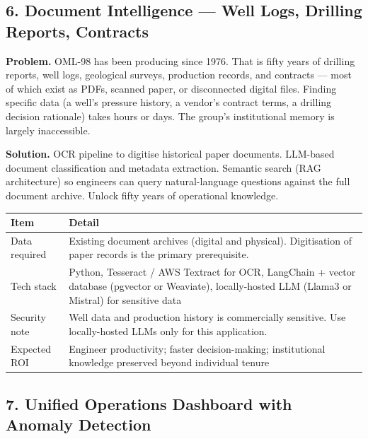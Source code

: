 \documentclass[10pt]{article}
\newcommand{\spacer}{\vspace{10pt}}
\newcommand{\bigspacer}{\vspace{16pt}}
\begin{document}
\bigspacer

\subsection*{6. Document Intelligence --- Well Logs, Drilling Reports, Contracts}

\textbf{Problem.}
OML-98 has been producing since 1976. That is fifty years of drilling reports,
well logs, geological surveys, production records, and contracts --- most of
which exist as PDFs, scanned paper, or disconnected digital files. Finding
specific data (a well's pressure history, a vendor's contract terms, a drilling
decision rationale) takes hours or days. The group's institutional memory is
largely inaccessible.

\textbf{Solution.}
OCR pipeline to digitise historical paper documents. LLM-based document
classification and metadata extraction. Semantic search (RAG architecture)
so engineers can query natural-language questions against the full document
archive. Unlock fifty years of operational knowledge.

\spacer
\small
\begin{tabularx}{\columnwidth}{@{}lX@{}}
\toprule
\textbf{Item} & \textbf{Detail} \\
\midrule
Data required     & Existing document archives (digital and physical).
                    Digitisation of paper records is the primary prerequisite. \\
Tech stack        & Python, Tesseract / AWS Textract for OCR, LangChain
                    + vector database (pgvector or Weaviate), locally-hosted
                    LLM (Llama3 or Mistral) for sensitive data \\
Security note     & Well data and production history is commercially sensitive.
                    Use locally-hosted LLMs only for this application. \\
Expected ROI      & Engineer productivity; faster decision-making;
                    institutional knowledge preserved beyond individual tenure \\
\bottomrule
\end{tabularx}
\normalsize

\bigspacer

\subsection*{7. Unified Operations Dashboard with Anomaly Detection}
\end{document}
